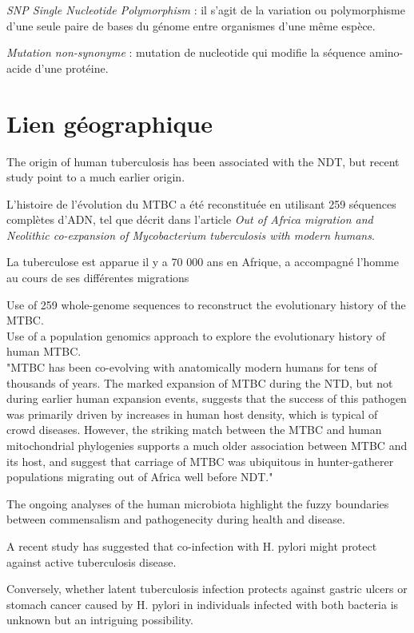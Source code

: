 \documentclass[twoside,a4paper,12pt,frenchb,openany]{report}
\begin{document}
\textit{SNP Single Nucleotide Polymorphism} : il s'agit de la variation ou polymorphisme d'une seule paire de bases du génome entre organismes d'une même espèce.

\textit{Mutation non-synonyme} : mutation de nucleotide qui modifie la séquence amino-acide d'une protéine.

\section{Lien géographique}

The origin of human tuberculosis has been associated with the NDT, but recent study point to a much earlier origin.

L'histoire de l'évolution du MTBC a été reconstituée en utilisant 259 séquences complètes d'ADN, tel que décrit dans l'article \textit{Out of Africa migration and Neolithic co-expansion of Mycobacterium tuberculosis with modern humans}. 

La tuberculose est apparue il y a 70 000 ans en Afrique, a accompagné l'homme au cours de ses différentes migrations 

Use of 259 whole-genome sequences to reconstruct the evolutionary history of the MTBC.\\
Use of a population genomics approach to explore the evolutionary history of human MTBC.\\

"MTBC has been co-evolving with anatomically modern humans for tens of thousands of years. The marked expansion of MTBC during the NTD, but not during earlier human expansion events, suggests that the success of this pathogen was primarily driven by increases in human host density, which is typical of crowd diseases. However, the striking match between the MTBC and human mitochondrial phylogenies supports a much older association between MTBC and its host, and suggest that carriage of MTBC was ubiquitous in hunter-gatherer populations migrating out of Africa well before NDT."

The ongoing analyses of the human microbiota highlight the fuzzy boundaries between commensalism and pathogenecity during health and disease.

A recent study has suggested that co-infection with H. pylori might protect against active tuberculosis disease.

Conversely, whether latent tuberculosis infection protects against gastric ulcers or stomach cancer caused by H. pylori in individuals infected with both bacteria is unknown but an intriguing possibility.
\end{document}
